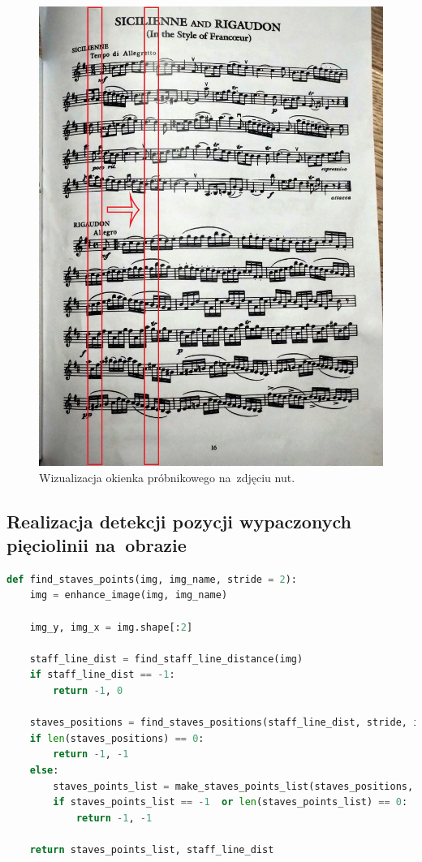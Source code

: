 \begin{figure}[H]
	\centering
	\includegraphics[width=12cm]{images/probe window demo.jpg}
	\caption{Wizualizacja okienka próbnikowego na~zdjęciu nut.}
	\label{fig:probe_window_demo}
\end{figure}

\pagebreak

\subsection{Realizacja detekcji pozycji wypaczonych pięciolinii na~obrazie}

\begin{lstlisting}[caption={\pyth|find_staves_points()| - funkcja odnajdywania pozycji pięciolinii na~obrazie.}, label={find-staves-points}, language=Python]
def find_staves_points(img, img_name, stride = 2):
	img = enhance_image(img, img_name)
	
	img_y, img_x = img.shape[:2]
	
	staff_line_dist = find_staff_line_distance(img)
	if staff_line_dist == -1:
		return -1, 0
	
	staves_positions = find_staves_positions(staff_line_dist, stride, img)
	if len(staves_positions) == 0:
		return -1, -1
	else:
		staves_points_list = make_staves_points_list(staves_positions, staff_line_dist)
		if staves_points_list == -1  or len(staves_points_list) == 0:
			return -1, -1

	return staves_points_list, staff_line_dist
\end{lstlisting}

